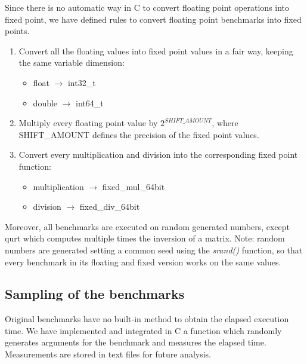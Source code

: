 Since there is no automatic way in C to convert floating point operations into fixed point, we have defined rules to convert floating point benchmarks into fixed points.
\begin{enumerate}
	\item Convert all the floating values into fixed point values in a fair way, keeping the same variable dimension:
	\begin{itemize}
		\item float $\rightarrow$ int32\_t	
		\item double $\rightarrow$ int64\_t
	\end{itemize}
	\item Multiply every floating point value by ${2}^{SHIFT\_AMOUNT}$, where SHIFT\_AMOUNT defines the precision of the fixed point values.
	\item Convert every multiplication and division into the corresponding fixed point function:
	\begin{itemize}
		\item multiplication $\rightarrow$ fixed\_mul\_64bit	
		\item division $\rightarrow$ fixed\_div\_64bit
	\end{itemize}
\end{enumerate}

Moreover, all benchmarks are executed on random generated numbers, except qurt which computes multiple times the inversion of a matrix.\newline
Note: random numbers are generated setting a common seed using the \textit{srand()} function, so that every benchmark in its floating and fixed version works on the same values.
\subsection{Sampling of the benchmarks}

Original benchmarks have no built-in method to obtain the elapsed execution time. We have implemented and integrated in C a function which randomly generates arguments for the benchmark and measures the elapsed time.
Measurements are stored in text files for future analysis.


